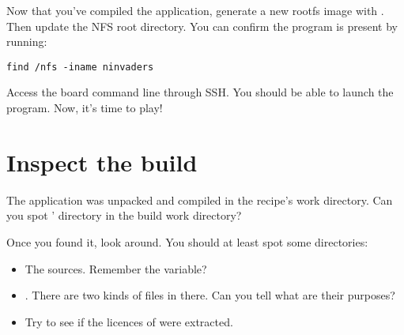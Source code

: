 Now that you've compiled the  application, generate a new
rootfs image with . Then update the
NFS root directory. You can confirm the  program is
present by running:
\begin{verbatim}
find /nfs -iname ninvaders
\end{verbatim}

Access the board command line through SSH. You should be able to
launch the  program. Now, it's time to play!

\section{Inspect the build}

The  application was unpacked and compiled in the
recipe's work directory. Can you spot ' directory in
the build work directory?

Once you found it, look around. You should at least spot some
directories:
\begin{itemize}
    \item The sources. Remember the  variable?
    \item {}. There are two kinds of files in there. Can you
      tell what are their purposes?
    \item Try to see if the licences of  were
      extracted.
\end{itemize}
